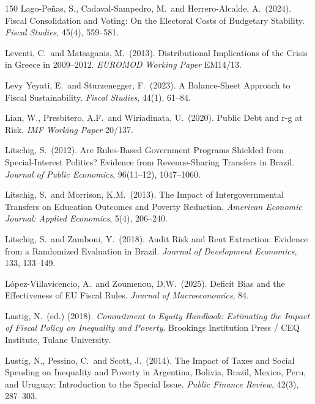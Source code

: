 \documentclass[11pt,a4paper]{article}
\begin{document}
\begin{thebibliography}{150}
 Lago-Pe\~nas, S., Cadaval-Sampedro, M.\ and Herrero-Alcalde, A.\ (2024). Fiscal Consolidation and Voting: On the Electoral Costs of Budgetary Stability. \textit{Fiscal Studies}, 45(4), 559--581.

 Leventi, C.\ and Matsaganis, M.\ (2013). Distributional Implications of the Crisis in Greece in 2009--2012. \textit{EUROMOD Working Paper} EM14/13.

 Levy Yeyati, E.\ and Sturzenegger, F.\ (2023). A Balance-Sheet Approach to Fiscal Sustainability. \textit{Fiscal Studies}, 44(1), 61--84.

 Lian, W., Presbitero, A.F.\ and Wiriadinata, U.\ (2020). Public Debt and r-g at Risk. \textit{IMF Working Paper} 20/137.

 Litschig, S.\ (2012). Are Rules-Based Government Programs Shielded from Special-Interest Politics? Evidence from Revenue-Sharing Transfers in Brazil. \textit{Journal of Public Economics}, 96(11--12), 1047--1060.

 Litschig, S.\ and Morrison, K.M.\ (2013). The Impact of Intergovernmental Transfers on Education Outcomes and Poverty Reduction. \textit{American Economic Journal: Applied Economics}, 5(4), 206--240.

 Litschig, S.\ and Zamboni, Y.\ (2018). Audit Risk and Rent Extraction: Evidence from a Randomized Evaluation in Brazil. \textit{Journal of Development Economics}, 133, 133--149.

 L\'opez-Villavicencio, A.\ and Zoumenou, D.W.\ (2025). Deficit Bias and the Effectiveness of EU Fiscal Rules. \textit{Journal of Macroeconomics}, 84.

 Lustig, N.\ (ed.) (2018). \textit{Commitment to Equity Handbook: Estimating the Impact of Fiscal Policy on Inequality and Poverty}. Brookings Institution Press / CEQ Institute, Tulane University.

 Lustig, N., Pessino, C.\ and Scott, J.\ (2014). The Impact of Taxes and Social Spending on Inequality and Poverty in Argentina, Bolivia, Brazil, Mexico, Peru, and Uruguay: Introduction to the Special Issue. \textit{Public Finance Review}, 42(3), 287--303.


\end{thebibliography}
\end{document}
